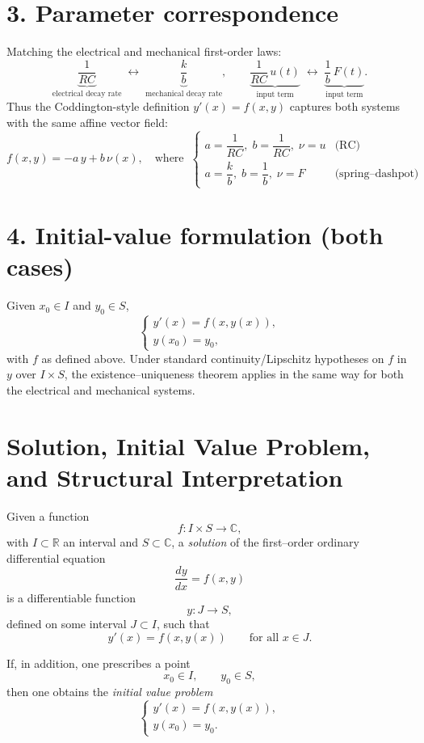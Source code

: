 \documentclass[12pt]{article}
\begin{document}
	\section*{3. Parameter correspondence}
	
	Matching the electrical and mechanical first-order laws:
	$$
	\underbrace{\frac{1}{RC}}_{\text{electrical decay rate}} 
	\;\longleftrightarrow\;
	\underbrace{\frac{k}{b}}_{\text{mechanical decay rate}},
	\qquad
	\underbrace{\frac{1}{RC}\,u(t)}_{\text{input term}}
	\;\longleftrightarrow\;
	\underbrace{\frac{1}{b}\,F(t)}_{\text{input term}}.
	$$
	Thus the Coddington-style definition $y'(x)=f(x,y)$ captures both systems with the same affine vector field:
	$$
	f(x,y)= -a\,y + b\,\nu(x),
	\quad
	\text{where}\;\; 
	\begin{cases}
		a=\dfrac{1}{RC}, \; b=\dfrac{1}{RC}, \; \nu=u & \text{(RC)}\\[0.5em]
		a=\dfrac{k}{b}, \; b=\dfrac{1}{b}, \; \nu=F & \text{(spring–dashpot)}
	\end{cases}
	$$
	
	\section*{4. Initial-value formulation (both cases)}
	Given $x_0\in I$ and $y_0\in S$,
	$$
	\boxed{\; 
		\begin{cases}
			y'(x)=f(x,y(x)),\\
			y(x_0)=y_0,
		\end{cases}
		\;}
	$$
	with $f$ as defined above. Under standard continuity/Lipschitz hypotheses on $f$ in $y$ over $I\times S$, the existence–uniqueness theorem applies in the same way for both the electrical and mechanical systems.
	
	\section*{Solution, Initial Value Problem, and Structural Interpretation}
	
	Given a function
	$$
	f : I \times S \to \mathbb{C},
	$$
	with \(I \subset \mathbb{R}\) an interval and \(S \subset \mathbb{C}\), a \emph{solution} of the first--order ordinary differential equation
	$$
	\frac{dy}{dx} = f(x,y)
	$$
	is a differentiable function
	$$
	y : J \to S,
	$$
	defined on some interval \(J \subset I\), such that
	$$
	y'(x)=f(x,y(x))
	\qquad \text{for all } x\in J.
	$$
	
	If, in addition, one prescribes a point
	$$
	x_0 \in I, \qquad y_0 \in S,
	$$
	then one obtains the \emph{initial value problem}
	$$
	\begin{cases}
		y'(x)=f(x,y(x)),\\
		y(x_0)=y_0.
	\end{cases}
	$$
	
\end{document}
